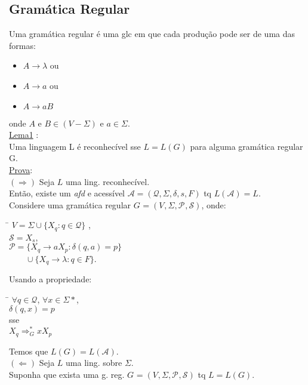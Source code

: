 \documentclass{article}
\newcommand{\gram}[1]{G_{#1} = (V_{#1},\Sigma,\mathcal{P}_{#1},\mathcal{S})}
\newcommand{\afnd}{\mathcal{A} = (\mathcal{Q},\Sigma, \delta, s, F)}
\begin{document}
\subsection{Gramática Regular}
    Uma gramática regular é uma glc em que cada produção pode ser de uma das formas:
    \begin{itemize}
        \item $ A \rightarrow \lambda $ ou
        \item $ A \rightarrow a $ ou
        \item $ A \rightarrow aB $
    \end{itemize}
    onde $A$ e $B \in (V-\Sigma)$ e $ a \in \Sigma $. \\
    \underline{Lema1} : \\
    Uma linguagem L é reconhecível sse $ L = L(G) $ para alguma gramática regular G. \\
    \underline{Prova}: \\[10pt]
    $ ( \Rightarrow ) $ Seja $L$ uma ling. reconhecível.\\
    Então, existe um \emph{afd} e acessível $\afnd$ tq $ L(\mathcal{A}) = L $. \\
    Considere uma gramática regular $\gram{}$, onde:
    \begin{tabbing}
        \hspace{1cm}\= $ V = \Sigma \cup \{ X_q : q \in \mathcal{Q} \}$ , \\
                    \> $ \mathcal{S} = X_s $, \\
                    \> $ \mathcal{P} = \{ X_q \rightarrow aX_p : \delta(q,a) = p \} $ \\
                    \> $\qquad \cup \{ X_q \rightarrow \lambda : q \in F \} $. 
    \end{tabbing}
    Usando a propriedade:
    \begin{tabbing}
        \hspace{1cm}\= $ \forall q \in \mathcal{Q}$, $ \forall x \in \Sigma* $, \\
                    \> $ \delta(q,x) = p $ \\
                    \> sse \\
                    \> $ X_q \Rightarrow_G^* xX_p $
    \end{tabbing}
    Temos que $ L(G) = L(\mathcal{A}) $. \\[10pt]
    $ ( \Leftarrow ) $ Seja $L$ uma ling. sobre $\Sigma$. \\
    Suponha que exista uma g. reg. $\gram{}$ tq $ L = L(G) $.\\
\end{document}
